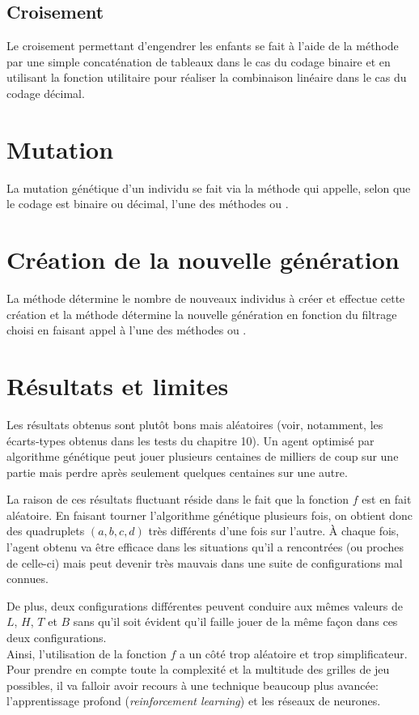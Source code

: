 \subsection{Croisement}

Le croisement permettant d'engendrer les enfants se fait à l'aide de la méthode  par une simple concaténation de tableaux dans le cas du codage binaire et en utilisant la fonction utilitaire  pour réaliser la combinaison linéaire dans le cas du codage décimal. 

\section{Mutation}

La mutation génétique d'un individu se fait via la méthode  qui appelle, selon que le codage est binaire ou décimal, l'une des méthodes  ou .

\section{Création de la nouvelle génération}

La méthode  détermine le nombre de nouveaux individus à créer et effectue cette création et la méthode  détermine la nouvelle génération en fonction du filtrage choisi en faisant appel à l'une des méthodes  ou .

\section{Résultats et limites}
Les résultats obtenus sont plutôt bons mais aléatoires (voir, notamment, les écarts-types obtenus dans les tests du chapitre 10). Un agent optimisé par algorithme génétique peut jouer plusieurs centaines de milliers de coup sur une partie mais perdre après seulement quelques centaines sur une autre.

La raison de ces résultats fluctuant réside dans le fait que la fonction $f$ est en fait aléatoire. En faisant tourner l'algorithme génétique plusieurs fois, on obtient donc des quadruplets $(a,b,c,d)$ très différents d'une fois sur l'autre. \`A chaque fois, l'agent obtenu va être efficace dans les situations qu'il a rencontrées (ou proches de celle-ci) mais peut devenir très mauvais dans une suite de configurations mal connues.

De plus, deux configurations différentes peuvent conduire aux mêmes valeurs de $L$, $H$, $T$ et $B$ sans qu'il soit évident qu'il faille jouer de la même façon dans ces deux configurations.\\

Ainsi, l'utilisation de la fonction $f$ a un côté trop aléatoire et trop simplificateur. Pour prendre en compte toute la complexité et la multitude des grilles de jeu possibles, il va falloir avoir recours à une technique beaucoup plus avancée: l'apprentissage profond (\textit{reinforcement learning}) et les réseaux de neurones.
